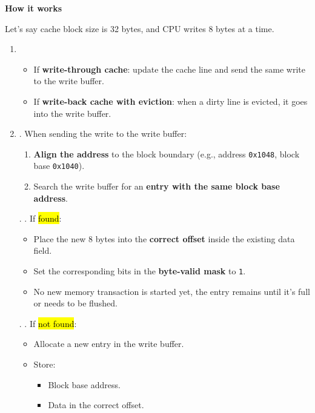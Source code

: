 \highspace
\begin{flushleft}
    \textcolor{Green3}{ \textbf{How it works}}
\end{flushleft}
Let's say cache block size is 32 bytes, and CPU writes 8 bytes at a time.
\begin{enumerate}
    \item {}
    \begin{itemize}
        \item If \textbf{write-through cache}: update the cache line and send the same write to the write buffer.
        \item If \textbf{write-back cache with eviction}: when a dirty line is evicted, it goes into the write buffer.
    \end{itemize}
    \item {}. When sending the write to the write buffer:
    \begin{enumerate}
        \item \textbf{Align the address} to the block boundary (e.g., address \texttt{0x1048}, block base \texttt{0x1040}).
        \item Search the write buffer for an \textbf{entry with the same block base address}.
    \end{enumerate}
    \item[\theenumi{a}.] . If \hl{found}:
    \begin{itemize}
        \item Place the new 8 bytes into the \textbf{correct offset} inside the existing data field.
        \item Set the corresponding bits in the \textbf{byte-valid mask} to \texttt{1}.
        \item No new memory transaction is started yet, the entry remains until it's full or needs to be flushed.
    \end{itemize}
    \setcounter{enumi}{\theenumi}
    \item[\theenumi{b}.] . If \hl{not found}:
    \begin{itemize}
        \item Allocate a new entry in the write buffer.
        \item Store:
        \begin{itemize}
            \item Block base address.
            \item Data in the correct offset.

\end{itemize}
\end{itemize}
\end{enumerate}
